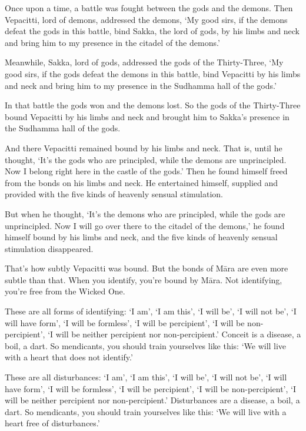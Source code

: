 \documentclass[12pt,openany]{book}%
\begin{document}
Once upon a time, a battle was fought between the gods and the demons. Then Vepacitti, lord of demons, addressed the demons, ‘My good sirs, if the demons defeat the gods in this battle, bind Sakka, the lord of gods, by his limbs and neck and bring him to my presence in the citadel of the demons.’ 

Meanwhile, Sakka, lord of gods, addressed the gods of the Thirty-Three, ‘My good sirs, if the gods defeat the demons in this battle, bind Vepacitti by his limbs and neck and bring him to my presence in the Sudhamma hall of the gods.’ 

In that battle the gods won and the demons lost. So the gods of the Thirty-Three bound Vepacitti by his limbs and neck and brought him to Sakka’s presence in the Sudhamma hall of the gods. 

And there Vepacitti remained bound by his limbs and neck. That is, until he thought, ‘It’s the gods who are principled, while the demons are unprincipled. Now I belong right here in the castle of the gods.’ Then he found himself freed from the bonds on his limbs and neck. He entertained himself, supplied and provided with the five kinds of heavenly sensual stimulation. 

But when he thought, ‘It’s the demons who are principled, while the gods are unprincipled. Now I will go over there to the citadel of the demons,’ he found himself bound by his limbs and neck, and the five kinds of heavenly sensual stimulation disappeared. 

That’s how subtly Vepacitti was bound. But the bonds of \textsanskrit{Māra} are even more subtle than that. When you identify, you’re bound by \textsanskrit{Māra}. Not identifying, you’re free from the Wicked One. 

These are all forms of identifying: ‘I am’, ‘I am this’, ‘I will be’, ‘I will not be’, ‘I will have form’, ‘I will be formless’, ‘I will be percipient’, ‘I will be non-percipient’, ‘I will be neither percipient nor non-percipient.’ Conceit is a disease, a boil, a dart. So mendicants, you should train yourselves like this: ‘We will live with a heart that does not identify.’ 

These are all disturbances: ‘I am’, ‘I am this’, ‘I will be’, ‘I will not be’, ‘I will have form’, ‘I will be formless’, ‘I will be percipient’, ‘I will be non-percipient’, ‘I will be neither percipient nor non-percipient.’ Disturbances are a disease, a boil, a dart. So mendicants, you should train yourselves like this: ‘We will live with a heart free of disturbances.’ 
\end{document}
